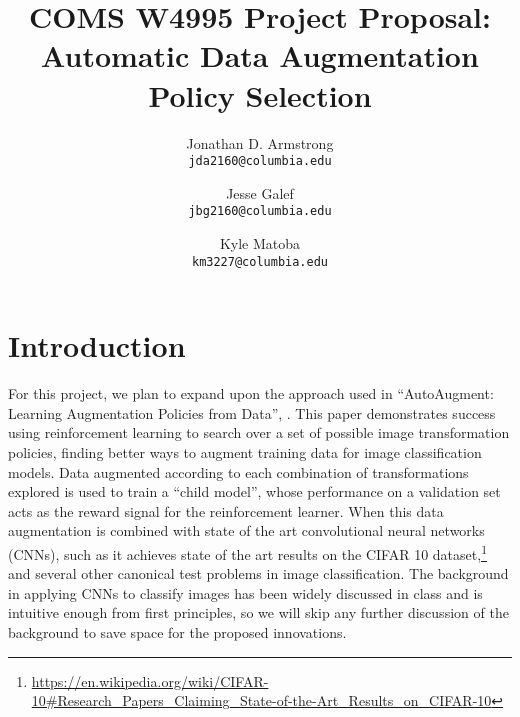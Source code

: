 \documentclass[10pt,twocolumn,letterpaper]{article}
\begin{document}
\title{COMS W4995 Project Proposal: Automatic Data Augmentation Policy Selection}

\author{Jonathan D. Armstrong\\
{\tt\small jda2160@columbia.edu}
\and
Jesse Galef\\
{\tt\small jbg2160@columbia.edu}
\and
Kyle Matoba\\
{\tt\small km3227@columbia.edu}
}

\maketitle


\section{Introduction}

For this project, we plan to expand upon the approach used in ``AutoAugment: Learning Augmentation Policies from Data'', \cite{Cubuk2018}. This paper demonstrates success using reinforcement learning to search over a set of possible image transformation policies, finding better ways to augment training data for image classification models. Data augmented according to each combination of transformations explored is used to train a ``child model'', whose performance on a validation set acts as the reward signal for the reinforcement learner. When this data augmentation is combined with state of the art convolutional neural networks (CNNs), such as \cite{Yamada2018} it achieves state of the art results on the CIFAR 10 dataset,\footnote{\url{https://en.wikipedia.org/wiki/CIFAR-10\#Research\_Papers\_Claiming\_State-of-the-Art\_Results\_on\_CIFAR-10}} and several other canonical test problems in image classification. The background in applying CNNs to classify images has been widely discussed in class and is intuitive enough from first principles, so we will skip any further discussion of the background to save space for the proposed innovations.
\end{document}
